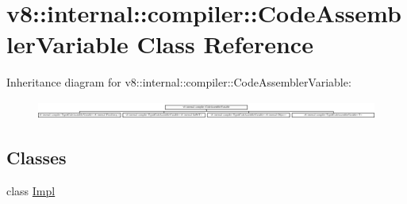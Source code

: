 \hypertarget{classv8_1_1internal_1_1compiler_1_1CodeAssemblerVariable}{}\section{v8\+:\+:internal\+:\+:compiler\+:\+:Code\+Assembler\+Variable Class Reference}
\label{classv8_1_1internal_1_1compiler_1_1CodeAssemblerVariable}
Inheritance diagram for v8\+:\+:internal\+:\+:compiler\+:\+:Code\+Assembler\+Variable\+:\begin{figure}[H]
\begin{center}
\leavevmode
\includegraphics[height=0.595745cm]{classv8_1_1internal_1_1compiler_1_1CodeAssemblerVariable}
\end{center}
\end{figure}
\subsection*{Classes}
\begin{DoxyCompactItemize}
\item 
class \mbox{\hyperlink{classv8_1_1internal_1_1compiler_1_1CodeAssemblerVariable_1_1Impl}{Impl}}
\end{DoxyCompactItemize}
